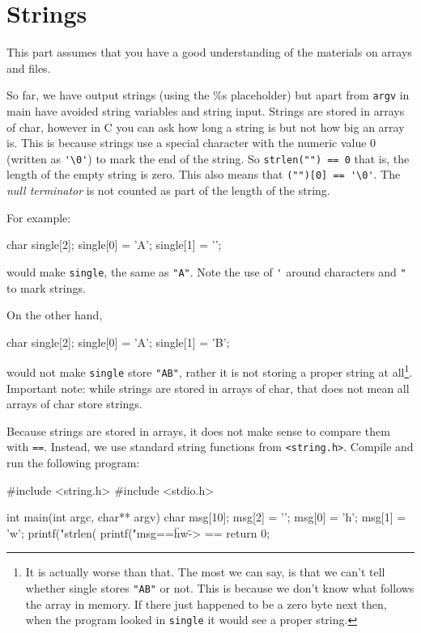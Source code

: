 
\chapter{Strings}

\begin{knowledge}
This part assumes that you have a good understanding of the materials on arrays and files. 
\end{knowledge}

So far, we have output strings (using the \%s placeholder) but apart from \texttt{argv} in main have avoided string variables and string input.
Strings are stored in arrays of char, however in C you can ask how long a string is but not how big an array is.
This is because strings use a special character with the numeric value $0$ (written as \verb!'\0'!) to mark the end of the string.
So \lstinline!strlen("") == 0! that is, the length of the empty string is zero.
This also means that \lstinline!("")[0] == '\0'!.
The \emph{null terminator} is not counted as part of the length of the string.


For example:

\begin{codeblock}
char single[2];
single[0] = 'A';
single[1] = '\0';
\end{codeblock}

would make \texttt{single}, the same as \verb!"A"!.
Note the use of \lstinline!'! around characters and \lstinline!"! to mark strings.

On the other hand,
\begin{codeblock}
char single[2];
single[0] = 'A';
single[1] = 'B';
\end{codeblock}
would not make \texttt{single} store \verb!"AB"!, rather it is not storing a proper string at all\footnote{It is actually worse than that.
The most we can say, is that we can't tell whether single stores \texttt{"AB"} or not.
This is because we don't know what follows the array in memory.
If there just happened to be a zero byte next then, when the program looked in \texttt{single} it would see a proper string.
}.
Important note: while strings are stored in arrays of char, that does not mean all arrays of char store strings.

Because strings are stored in arrays, it does not make sense to compare them with \texttt{==}.
Instead, we use standard string functions from \lstinline{<string.h>}.
Compile and run the following program:
\begin{codeblock}
#include <string.h>
#include <stdio.h>

int main(int argc, char** argv) {
    char msg[10];	
    msg[2] = '\0';
    msg[0] = 'h';
    msg[1] = 'w';
    printf("strlen(%
    printf("msg==\"hw\" -> %
        ==%
    return 0;
}
\end{codeblock}

